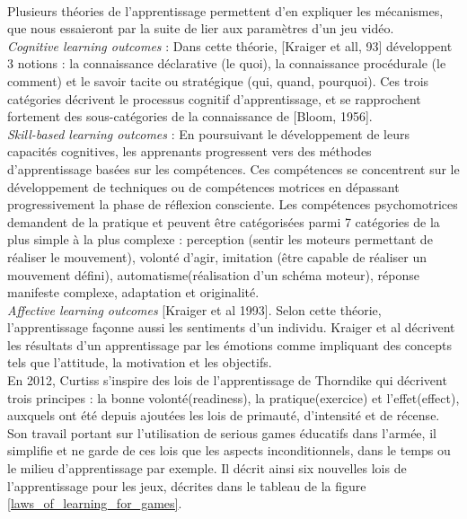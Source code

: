 \paragraph{}Plusieurs théories de l'apprentissage permettent d'en expliquer les mécanismes, que nous essaieront par la suite de lier aux paramètres d'un jeu vidéo.\\

\emph{Cognitive learning outcomes} :  Dans cette théorie, [Kraiger et all, 93] développent 3 notions : la connaissance déclarative (le quoi), la connaissance procédurale (le comment) et le savoir tacite ou stratégique (qui, quand, pourquoi). Ces trois catégories décrivent le processus cognitif d'apprentissage, et se rapprochent fortement des sous-catégories de la connaissance de [Bloom, 1956].\\ 

\emph{Skill-based learning outcomes} : En poursuivant le développement de leurs capacités cognitives, les apprenants progressent vers des méthodes d'apprentissage basées sur les compétences. Ces compétences se concentrent sur le développement de techniques ou de compétences motrices en dépassant progressivement la phase de réflexion consciente. Les compétences psychomotrices demandent de la pratique et peuvent être catégorisées parmi 7 catégories de la plus simple à la plus complexe : perception (sentir les moteurs permettant de réaliser le mouvement), volonté d'agir, imitation (être capable de réaliser un mouvement défini), automatisme(réalisation d'un schéma moteur), réponse manifeste complexe, adaptation et originalité.\\ 

\emph{Affective learning outcomes} [Kraiger et al 1993]. Selon cette théorie, l'apprentissage façonne aussi les sentiments d'un individu. Kraiger et al décrivent les résultats d'un apprentissage par les émotions comme impliquant des concepts tels que l'attitude, la motivation et les objectifs.\\

En 2012, Curtiss s'inspire des lois de l'apprentissage de Thorndike qui décrivent trois principes : la bonne volonté(readiness), la pratique(exercice) et l'effet(effect), auxquels ont été depuis ajoutées les lois de primauté, d'intensité et de récense. Son travail portant sur l'utilisation de serious games éducatifs dans l'armée, il simplifie et ne garde de ces lois que les aspects inconditionnels, dans le temps ou le milieu d'apprentissage par exemple. Il décrit ainsi six nouvelles lois de l'apprentissage pour les jeux, décrites dans le tableau de la figure \ref{laws_of_learning_for_games}.

